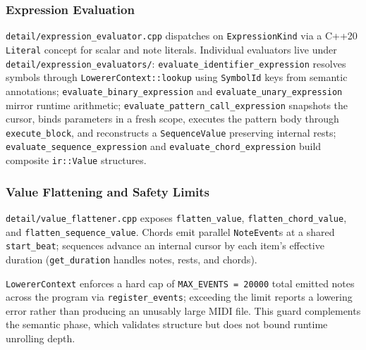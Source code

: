 \subsubsection{Expression Evaluation}

\texttt{detail/expression\_evaluator.cpp} dispatches on \texttt{ExpressionKind} via a C++20 \texttt{Literal} concept
for scalar and note literals.
Individual evaluators live under \texttt{detail/expression\_evaluators/}:
\texttt{evaluate\_identifier\_expression} resolves symbols through \texttt{LowererContext::lookup} using
\texttt{SymbolId} keys from semantic annotations;
\texttt{evaluate\_binary\_expression} and \texttt{evaluate\_unary\_expression} mirror runtime arithmetic;
\texttt{evaluate\_pattern\_call\_expression} snapshots the cursor, binds parameters in a fresh scope, executes the
pattern body through \texttt{execute\_block}, and reconstructs a \texttt{SequenceValue} preserving internal rests;
\texttt{evaluate\_sequence\_expression} and \texttt{evaluate\_chord\_expression} build composite \texttt{ir::Value}
structures.

\subsubsection{Value Flattening and Safety Limits}

\texttt{detail/value\_flattener.cpp} exposes \texttt{flatten\_value}, \texttt{flatten\_chord\_value}, and
\texttt{flatten\_sequence\_value}.
Chords emit parallel \texttt{NoteEvent}s at a shared \texttt{start\_beat}; sequences advance an internal cursor by each
item's effective duration (\texttt{get\_duration} handles notes, rests, and chords).

\texttt{LowererContext} enforces a hard cap of \texttt{MAX\_EVENTS = 20000} total emitted notes across the program via
\texttt{register\_events}; exceeding the limit reports a lowering error rather than producing an unusably large MIDI
file.
This guard complements the semantic phase, which validates structure but does not bound runtime unrolling depth.

